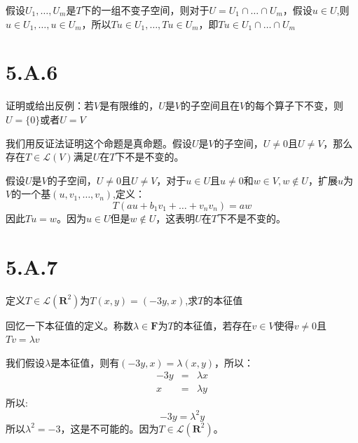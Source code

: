 \documentclass[10pt,a4paper,UTF8]{article}
\begin{document}
\begin{answer}
假设\(U_{1},\ldots ,U_{m}\)是\(T\)下的一组不变子空间，则对于\(U = U_{1}\cap \ldots \cap U_{m}\)，假设\(u\in U\),则\(u\in U_{1},\ldots ,u\in U_{m}\)，所以\(Tu \in U_{1},\ldots ,Tu \in U_{m}\)，即\(Tu \in U_{1} \cap \ldots \cap U_{m}\)
\end{answer}
\section{5.A.6}
\label{sec:orgb75f46a}


\begin{problem}
证明或给出反例：若\(V\)是有限维的，\(U\)是\(V\)的子空间且在\(V\)的每个算子下不变，则\(U=\{0\}\)或者\(U=V\)
\end{problem}

\begin{answer}
我们用反证法证明这个命题是真命题。假设\(U\)是\(V\)的子空间，\(U\neq 0\)且\(U\neq V\)，那么存在\(T\in \mathcal{L}(V)\)满足\(U\)在\(T\)下不是不变的。

假设\(U\)是\(V\)的子空间，\(U\neq 0\)且\(U\neq V\)，对于\(u\in U\)且\(u\neq 0\)和\(w\in V, w\notin U\)，扩展\(u\)为\(V\)的一个基\((u,v_{1},\ldots ,v_{n})\),定义：\[T(au+b_{1}v_{1} + \ldots + v_{n}v_{n}) = aw\]
因此\(Tu = w\)。因为\(u\in U\)但是\(w\notin U\)，这表明\(U\)在\(T\)下不是不变的。
\end{answer}
\section{5.A.7}
\label{sec:org0442ebe}


\begin{problem}
定义\(T\in \mathcal{L}(\mathbf{R}^{2})\)为\(T(x,y) = (-3y,x)\),求\(T\)的本征值
\end{problem}

\begin{answer}
回忆一下本征值的定义。称数\(\lambda \in \mathbf{F}\)为\(T\)的本征值，若存在\(v\in V\)使得\(v\neq 0\)且\(Tv = \lambda v\)

我们假设\(\lambda\)是本征值，则有\((-3y,x) = \lambda (x,y)\)，所以：
\begin{eqnarray}
\label{eq:1}
-3y&=& \lambda x \\
x&=& \lambda y
\end{eqnarray}
所以:
\begin{equation}
\label{eq:2}
-3y = \lambda^{2}y
\end{equation}
所以\(\lambda^{2} =  - 3\)，这是不可能的。因为\(T\in \mathcal{L}(\mathbf{R}^{2})\)。
\end{answer}
\end{document}
